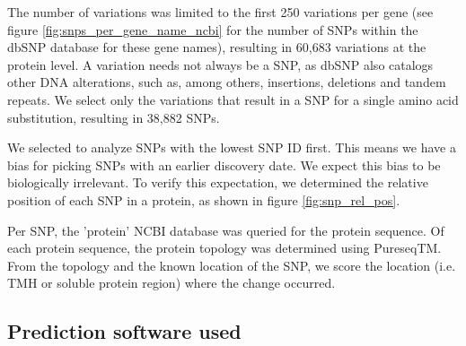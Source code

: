 The number of variations
was limited to the first 250 variations per gene (see figure
\ref{fig:snps_per_gene_name_ncbi} for the number of SNPs
within the dbSNP database for these gene names),
resulting in 60,683 variations at the protein level.
A variation needs not always be a SNP,
as dbSNP also catalogs other DNA alterations, such as, among others, insertions,
deletions and tandem repeats.
We select only the variations that result in a SNP for
a single amino acid substitution, resulting in 38,882 SNPs.

%
We selected to analyze SNPs with the lowest SNP ID first.
This means we have a bias for picking SNPs with
an earlier discovery date.
We expect this bias to be biologically irrelevant.
To verify this expectation, we determined the
relative position of each SNP in a protein,
as shown in figure \ref{fig:snp_rel_pos}.

Per SNP, the 'protein' NCBI database was queried for the
protein sequence.
Of each protein sequence, the protein topology was determined 
using PureseqTM.
From the topology and the known location of the SNP, 
we score the location (i.e. TMH or soluble protein region) 
where the change occurred.

\subsection{Prediction software used}
\label{subsec:prediction_software_used}


